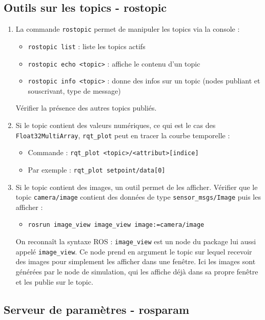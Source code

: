 \documentclass[12pt,a4paper]{article}
\begin{document}
\subsection{Outils sur les topics - rostopic}
\begin{enumerate}

\item La commande \texttt{rostopic} permet de manipuler les topics via la console :
\begin{itemize}
\item \texttt{rostopic list} : liste les topics actifs
\item \texttt{rostopic echo <topic>} : affiche le contenu d'un topic
\item \texttt{rostopic info <topic>} : donne des infos sur un topic (nodes publiant et souscrivant, type de message)
\end{itemize}
Vérifier la présence des autres topics publiés.
\item Si le topic contient des valeurs numériques, ce qui est le cas des \texttt{Float32MultiArray}, \texttt{rqt\_plot} peut en tracer la courbe temporelle : 
\begin{itemize}
\item Commande : \texttt{rqt\_plot <topic>/<attribut>[indice] }
\item Par exemple : \texttt{rqt\_plot setpoint/data[0]}
\end{itemize}
\item Si le topic contient des images, un outil permet de les afficher. Vérifier que le topic \texttt{camera/image} contient des données de type \texttt{sensor\_msgs/Image} puis les afficher :
\begin{itemize}
\item \texttt{rosrun image\_view image\_view image:=camera/image}
\end{itemize}
On reconnaît la syntaxe ROS : \texttt{image\_view} est un node du package lui aussi appelé \texttt{image\_view}. Ce node prend en argument le topic sur lequel recevoir des images pour simplement les afficher dans une fenêtre.
Ici les images sont générées par le node de simulation, qui les affiche déjà dans sa propre fenêtre et les publie sur le topic.
\end{enumerate}

\subsection{Serveur de paramètres - rosparam}
\end{document}
